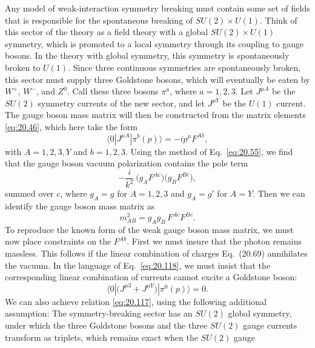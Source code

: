 Any model of weak-interaction symmetry breaking must contain some set of
fields that is responsible for the spontaneous breaking of $SU(2)\times U(1)$.
Think of this sector of the theory as a field theory with a global
$SU(2)\times U(1)$ symmetry, which is promoted to a local symmetry through its
coupling to gauge bosons.  In the theory with global symmetry, this symmetry
is spontaneously broken to $U(1)$.  Since three continuous symmetries are
spontaneously broken, this sector must supply three Goldstone bosons, which
will eventually be eaten by $W^+$, $W^-$, and $Z^0$.  Call these three bosons
$\pi^a$, where $a = 1, 2, 3$.  Let $J^{\mu A}$ be the $SU(2)$ symmetry
currents of the new sector, and let $J^{\mu Y}$ be the $U(1)$ current.  The
gauge boson mass matrix will then be constructed from the matrix elements
\eqref{eq:20.46}, which here take the form
\begin{equation}
  \langle 0|J^{\mu A}|\pi^b(p)\rangle = -ip^\mu F^{Ab} ,
  \label{eq:20.118}
\end{equation}
with $A = 1, 2, 3, Y$ and $b = 1, 2, 3$.  Using the method of
Eq.~\eqref{eq:20.55}, we find that the gauge boson vacuum polarization
contains the pole term
\begin{equation}
  -\frac{i}{k^2}\ \bigl( g_AF^{Ac} \bigr)\bigl( g_BF^{Bc} \bigr) ,
  \label{eq:20.119}
\end{equation}
summed over $c$, where $g_A = g$ for $A = 1, 2, 3$ and $g_A = g'$ for
$A = Y$.  Then we can identify the gauge boson mass matrix as
\begin{equation}
  m^2_{AB} = g_Ag_B\,F^{Ac}F^{Bc} .
  \label{eq:20.120}
\end{equation}
To reproduce the known form of the weak gauge boson mass matrix, we must now
place constraints on the $F^{Ab}$.  First we must insure that the photon
remains massless.  This follows if the linear combination of charges
Eq.~(20.69) annihilates the vacuum.  In the language of
Eq.~\eqref{eq:20.118}, we must insist that the corresponding linear
combination of currents cannot excite a Goldstone boson:
\begin{equation}
  \langle 0|\bigl( J^{\mu 3} + J^{\mu Y} \bigr)|\pi^0(p)\rangle = 0 .
  \label{eq:20.121}
\end{equation}
We can also achieve relation \eqref{eq:20.117}, using the following
additional assumption: The symmetry-breaking sector has an $SU(2)$ global
symmetry, under which the three Goldstone bosons and the three $SU(2)$ gauge
currents transform as triplets, which remains exact when the $SU(2)$ gauge
